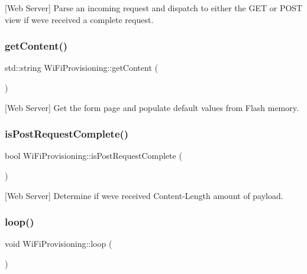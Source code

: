 \mbox{[}Web Server\mbox{]} Parse an incoming request and dispatch to either the G\+ET or P\+O\+ST view if we\textquotesingle{}ve received a complete request. \mbox{\label{class_wi_fi_provisioning_ae3cfba93792f975df0bddf6328330d68}} 
\subsubsection{\texorpdfstring{get\+Content()}{getContent()}}
{\footnotesize\ttfamily std\+::string Wi\+Fi\+Provisioning\+::get\+Content (\begin{DoxyParamCaption}{ }\end{DoxyParamCaption})\hspace{0.3cm}{\ttfamily [private]}}

\mbox{[}Web Server\mbox{]} Get the form page and populate default values from Flash memory. \mbox{\label{class_wi_fi_provisioning_abab0aebc8cca7590962e6e513010fb43}} 
\subsubsection{\texorpdfstring{is\+Post\+Request\+Complete()}{isPostRequestComplete()}}
{\footnotesize\ttfamily bool Wi\+Fi\+Provisioning\+::is\+Post\+Request\+Complete (\begin{DoxyParamCaption}{ }\end{DoxyParamCaption})\hspace{0.3cm}{\ttfamily [private]}}

\mbox{[}Web Server\mbox{]} Determine if we\textquotesingle{}ve received Content-\/\+Length amount of payload. \mbox{\label{class_wi_fi_provisioning_afe176c8aa10c718471ea8608d335d1c4}} 
\subsubsection{\texorpdfstring{loop()}{loop()}}
{\footnotesize\ttfamily void Wi\+Fi\+Provisioning\+::loop (\begin{DoxyParamCaption}{ }\end{DoxyParamCaption})}

